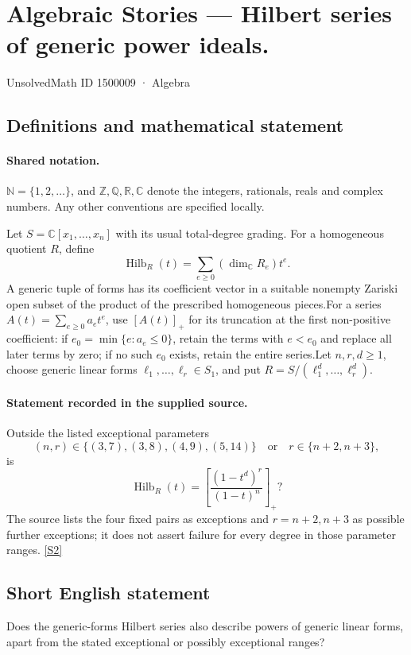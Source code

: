 \documentclass[11pt]{article}
\newcommand{\sref}[2]{\hyperlink{source:#1:#2}{[S#2]}}
\begin{document}
\setcounter{section}{1500008}
\section{Algebraic Stories — Hilbert series of generic power ideals.}\label{1500009}
{\small\sffamily UnsolvedMath ID 1500009 · Algebra}
\subsection{Definitions and mathematical statement}

\paragraph{Shared notation.}$\mathbb N=\{1,2,\ldots\}$, and $\mathbb Z,\mathbb Q,\mathbb R,\mathbb C$ denote the integers, rationals, reals and complex numbers. Any other conventions are specified locally.


Let $S=\mathbb C[x_1,\ldots,x_n]$ with its usual total-degree grading. For a homogeneous quotient $R$, define
\[\operatorname{Hilb}_R(t)=\sum_{e\geq0}(\dim_{\mathbb C}R_e)t^e.
\]
A generic tuple of forms has its coefficient vector in a suitable nonempty Zariski open subset of the product of the prescribed homogeneous pieces.For a series $A(t)=\sum_{e\geq0}a_et^e$, use $[A(t)]_+$ for its truncation at the first non-positive coefficient: if $e_0=\min\{e:a_e\leq0\}$, retain the terms with $e<e_0$ and replace all later terms by zero; if no such $e_0$ exists, retain the entire series.Let $n,r,d\geq1$, choose generic linear forms $\ell_1,\ldots,\ell_r\in S_1$, and put $R=S/(\ell_1^d,\ldots,\ell_r^d)$.
\paragraph{Statement recorded in the supplied source.}
Outside the listed exceptional parameters
\[(n,r)\in\{(3,7),(3,8),(4,9),(5,14)\}\quad\text{or}\quad r\in\{n+2,n+3\},
\]
is
\[\operatorname{Hilb}_R(t)=\left[\frac{(1-t^d)^r}{(1-t)^n}\right]_+?
\]
The source lists the four fixed pairs as exceptions and $r=n+2,n+3$ as possible further exceptions; it does not assert failure for every degree in those parameter ranges. \sref{1500009}{2}
\subsection{Short English statement}
Does the generic-forms Hilbert series also describe powers of generic linear forms, apart from the stated exceptional or possibly exceptional ranges?
\end{document}

